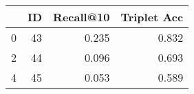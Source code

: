 \begin{tabular}{lrrr}
\toprule
{} &  ID &  Recall@10 &  Triplet Acc \\
\midrule
0 &  43 &      0.235 &        0.832 \\
2 &  44 &      0.096 &        0.693 \\
4 &  45 &      0.053 &        0.589 \\
\bottomrule
\end{tabular}
